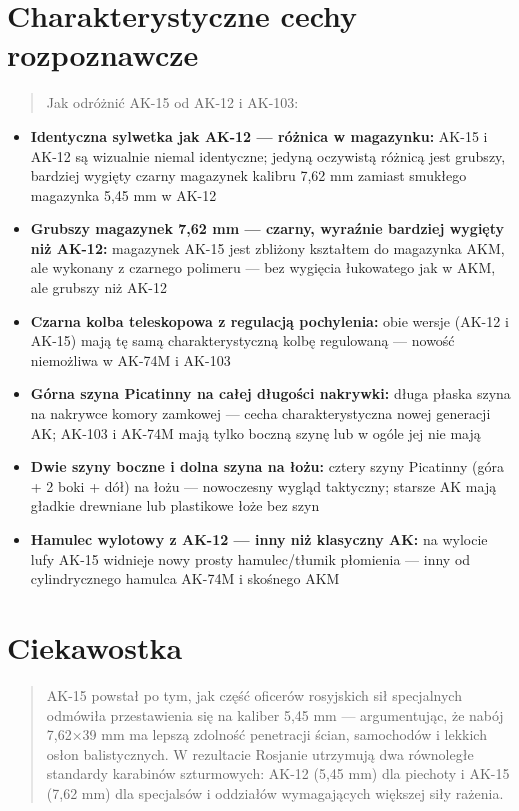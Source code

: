 \documentclass[12pt,openany,oneside]{book}
\providecommand{\tightlist}{%
  \setlength{\itemsep}{0pt}\setlength{\parskip}{0pt}}
\begin{document}
\section{Charakterystyczne cechy
rozpoznawcze}\label{charakterystyczne-cechy-rozpoznawcze-49}

\begin{quote}
Jak odróżnić AK-15 od AK-12 i AK-103:
\end{quote}

\begin{itemize}
\tightlist
\item
  \textbf{Identyczna sylwetka jak AK-12 --- różnica w magazynku:} AK-15
  i AK-12 są wizualnie niemal identyczne; jedyną oczywistą różnicą jest
  grubszy, bardziej wygięty czarny magazynek kalibru 7,62 mm zamiast
  smukłego magazynka 5,45 mm w AK-12
\item
  \textbf{Grubszy magazynek 7,62 mm --- czarny, wyraźnie bardziej
  wygięty niż AK-12:} magazynek AK-15 jest zbliżony kształtem do
  magazynka AKM, ale wykonany z czarnego polimeru --- bez wygięcia
  łukowatego jak w AKM, ale grubszy niż AK-12
\item
  \textbf{Czarna kolba teleskopowa z regulacją pochylenia:} obie wersje
  (AK-12 i AK-15) mają tę samą charakterystyczną kolbę regulowaną ---
  nowość niemożliwa w AK-74M i AK-103
\item
  \textbf{Górna szyna Picatinny na całej długości nakrywki:} długa
  płaska szyna na nakrywce komory zamkowej --- cecha charakterystyczna
  nowej generacji AK; AK-103 i AK-74M mają tylko boczną szynę lub w
  ogóle jej nie mają
\item
  \textbf{Dwie szyny boczne i dolna szyna na łożu:} cztery szyny
  Picatinny (góra + 2 boki + dół) na łożu --- nowoczesny wygląd
  taktyczny; starsze AK mają gładkie drewniane lub plastikowe łoże bez
  szyn
\item
  \textbf{Hamulec wylotowy z AK-12 --- inny niż klasyczny AK:} na
  wylocie lufy AK-15 widnieje nowy prosty hamulec/tłumik płomienia ---
  inny od cylindrycznego hamulca AK-74M i skośnego AKM
\end{itemize}

\section{Ciekawostka}\label{ciekawostka-49}

\begin{quote}
AK-15 powstał po tym, jak część oficerów rosyjskich sił specjalnych
odmówiła przestawienia się na kaliber 5,45 mm --- argumentując, że nabój
7,62×39 mm ma lepszą zdolność penetracji ścian, samochodów i lekkich
osłon balistycznych. W rezultacie Rosjanie utrzymują dwa równoległe
standardy karabinów szturmowych: AK-12 (5,45 mm) dla piechoty i AK-15
(7,62 mm) dla specjalsów i oddziałów wymagających większej siły rażenia.
\end{quote}
\end{document}
